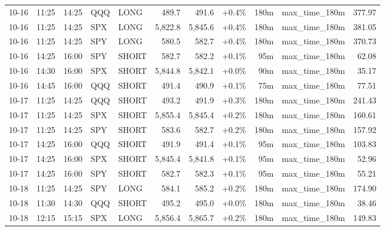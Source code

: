 \documentclass[11pt,a4paper,twoside]{article}
\begin{document}
\begin{center}
\begin{longtable}{>{\color{txtmain}}l l l l l r r r r >{\color{txtmain}}l r}
10-16 & 11:25 & 14:25 & QQQ & LONG & 489.7 & 491.6 & \textcolor{wingreen}{+0.4\%} & 180m & max\_time\_180m & \textcolor{wingreen}{377.97} \\
10-16 & 11:25 & 14:25 & SPX & LONG & 5,822.8 & 5,845.6 & \textcolor{wingreen}{+0.4\%} & 180m & max\_time\_180m & \textcolor{wingreen}{381.05} \\
10-16 & 11:25 & 14:25 & SPY & LONG & 580.5 & 582.7 & \textcolor{wingreen}{+0.4\%} & 180m & max\_time\_180m & \textcolor{wingreen}{370.73} \\
10-16 & 14:25 & 16:00 & SPY & SHORT & 582.7 & 582.2 & \textcolor{wingreen}{+0.1\%} & 95m & max\_time\_180m & \textcolor{wingreen}{62.08} \\
10-16 & 14:30 & 16:00 & SPX & SHORT & 5,844.8 & 5,842.1 & \textcolor{wingreen}{+0.0\%} & 90m & max\_time\_180m & \textcolor{wingreen}{35.17} \\
10-16 & 14:45 & 16:00 & QQQ & SHORT & 491.4 & 490.9 & \textcolor{wingreen}{+0.1\%} & 75m & max\_time\_180m & \textcolor{wingreen}{77.51} \\
10-17 & 11:25 & 14:25 & QQQ & SHORT & 493.2 & 491.9 & \textcolor{wingreen}{+0.3\%} & 180m & max\_time\_180m & \textcolor{wingreen}{241.43} \\
10-17 & 11:25 & 14:25 & SPX & SHORT & 5,855.4 & 5,845.4 & \textcolor{wingreen}{+0.2\%} & 180m & max\_time\_180m & \textcolor{wingreen}{160.61} \\
10-17 & 11:25 & 14:25 & SPY & SHORT & 583.6 & 582.7 & \textcolor{wingreen}{+0.2\%} & 180m & max\_time\_180m & \textcolor{wingreen}{157.92} \\
10-17 & 14:25 & 16:00 & QQQ & SHORT & 491.9 & 491.4 & \textcolor{wingreen}{+0.1\%} & 95m & max\_time\_180m & \textcolor{wingreen}{103.83} \\
10-17 & 14:25 & 16:00 & SPX & SHORT & 5,845.4 & 5,841.8 & \textcolor{wingreen}{+0.1\%} & 95m & max\_time\_180m & \textcolor{wingreen}{52.96} \\
10-17 & 14:25 & 16:00 & SPY & SHORT & 582.7 & 582.3 & \textcolor{wingreen}{+0.1\%} & 95m & max\_time\_180m & \textcolor{wingreen}{55.21} \\
10-18 & 11:25 & 14:25 & SPY & LONG & 584.1 & 585.2 & \textcolor{wingreen}{+0.2\%} & 180m & max\_time\_180m & \textcolor{wingreen}{174.90} \\
10-18 & 11:30 & 14:30 & QQQ & SHORT & 495.2 & 495.0 & \textcolor{wingreen}{+0.0\%} & 180m & max\_time\_180m & \textcolor{wingreen}{38.46} \\
10-18 & 12:15 & 15:15 & SPX & LONG & 5,856.4 & 5,865.7 & \textcolor{wingreen}{+0.2\%} & 180m & max\_time\_180m & \textcolor{wingreen}{149.83} \\

\end{longtable}
\end{center}
\end{document}
